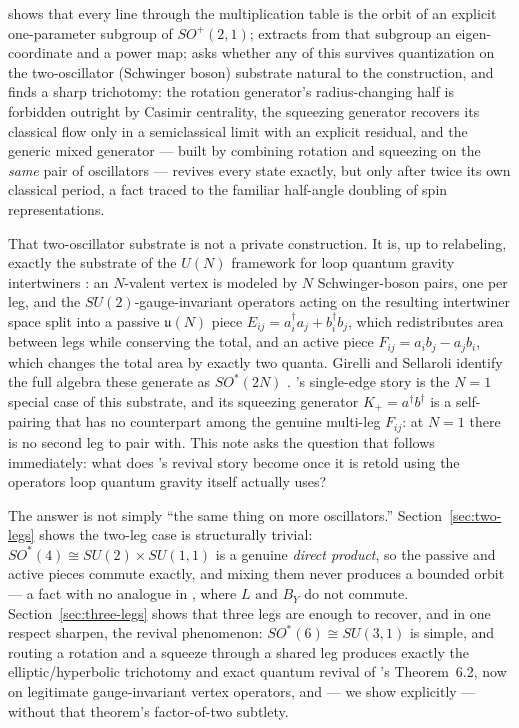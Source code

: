 \documentclass[11pt]{amsart}
\theoremstyle{remark}
\begin{document}
\cite{ConicTheorem} shows that every line through the multiplication table is the orbit of an explicit one-parameter subgroup of $SO^+(2,1)$; \cite{EigenCoordinates} extracts from that subgroup an eigen-coordinate and a power map; \cite{QuantumRealizations} asks whether any of this survives quantization on the two-oscillator (Schwinger boson) substrate natural to the construction, and finds a sharp trichotomy: the rotation generator's radius-changing half is forbidden outright by Casimir centrality, the squeezing generator recovers its classical flow only in a semiclassical limit with an explicit residual, and the generic mixed generator --- built by combining rotation and squeezing on the \emph{same} pair of oscillators --- revives every state exactly, but only after twice its own classical period, a fact traced to the familiar half-angle doubling of spin representations.

That two-oscillator substrate is not a private construction. It is, up to relabeling, exactly the substrate of the $U(N)$ framework for loop quantum gravity intertwiners \cite{GirelliLivine,FreidelLivine,BorjaEtal}: an $N$-valent vertex is modeled by $N$ Schwinger-boson pairs, one per leg, and the $SU(2)$-gauge-invariant operators acting on the resulting intertwiner space split into a passive $\mathfrak u(N)$ piece $E_{ij}=a_i^\dagger a_j+b_i^\dagger b_j$, which redistributes area between legs while conserving the total, and an active piece $F_{ij}=a_ib_j-a_jb_i$, which changes the total area by exactly two quanta. Girelli and Sellaroli identify the full algebra these generate as $SO^*(2N)$ \cite{GirelliSellaroli}. \cite{QuantumRealizations}'s single-edge story is the $N=1$ special case of this substrate, and its squeezing generator $K_+=a^\dagger b^\dagger$ is a self-pairing that has no counterpart among the genuine multi-leg $F_{ij}$: at $N=1$ there is no second leg to pair with. This note asks the question that follows immediately: what does \cite{QuantumRealizations}'s revival story become once it is retold using the operators loop quantum gravity itself actually uses?

The answer is not simply ``the same thing on more oscillators.'' Section~\ref{sec:two-legs} shows the two-leg case is structurally trivial: $SO^*(4)\cong SU(2)\times SU(1,1)$ is a genuine \emph{direct product}, so the passive and active pieces commute exactly, and mixing them never produces a bounded orbit --- a fact with no analogue in \cite{QuantumRealizations}, where $L$ and $B_Y$ do not commute. Section~\ref{sec:three-legs} shows that three legs are enough to recover, and in one respect sharpen, the revival phenomenon: $SO^*(6)\cong SU(3,1)$ is simple, and routing a rotation and a squeeze through a shared leg produces exactly the elliptic/hyperbolic trichotomy and exact quantum revival of \cite{QuantumRealizations}'s Theorem~6.2, now on legitimate gauge-invariant vertex operators, and --- we show explicitly --- without that theorem's factor-of-two subtlety.
\end{document}
